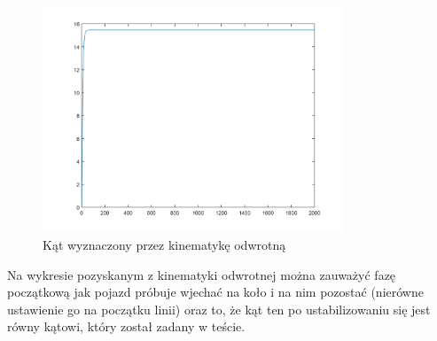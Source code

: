 \documentclass[a4paper, 12pt]{report}
\begin{document}
				\begin{figure}[H]
					\centering
					\includegraphics[width = 0.8\textwidth]{./AP/img/step_1_in_3.png}
					\caption{Kąt wyznaczony przez kinematykę odwrotną}
				\end{figure}
				\noindent Na wykresie pozyskanym z kinematyki odwrotnej można zauważyć fazę początkową jak pojazd próbuje wjechać na koło i na nim pozostać (nierówne ustawienie go na początku linii) oraz to, że kąt ten po ustabilizowaniu się jest równy kątowi, który został zadany w teście.
			\newpage
\end{document}
